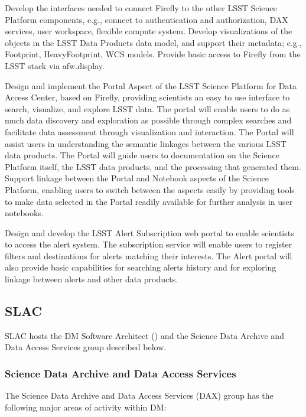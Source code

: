 Develop the interfaces needed to connect Firefly to the other LSST Science Platform components, e.g., connect to authentication and authorization, DAX services, user workspace, flexible compute system.  Develop visualizations of the objects in the LSST Data Products data model, and support their metadata; e.g., Footprint, HeavyFootprint, WCS models.  Provide basic access to Firefly from the LSST stack via afw.display.

Design and implement the Portal Aspect of the LSST Science Platform for Data Access Center, based on Firefly, providing scientists an easy to use interface to search, visualize, and explore LSST data. The portal will enable users to do as much data discovery and exploration as possible through complex searches and facilitate data assessment through visualization and interaction.  The Portal will assist users in understanding the semantic linkages between the various LSST data products. The Portal will guide users to documentation on the Science Platform itself, the LSST data products, and the processing that generated them.  Support linkage between the Portal and Notebook aspects of the Science Platform, enabling users to switch between the aspects easily by providing tools to make data selected in the Portal readily available for further analysis in user notebooks.

Design and develop the LSST Alert Subscription web portal to enable scientists to access the alert system. The subscription service will enable users to register filters and destinations for alerts matching their interests. The Alert portal will also provide basic capabilities for searching alerts history and for exploring linkage between alerts and other data products.




\subsection {SLAC\label{sect:slac}}
SLAC hosts the DM Software Architect () and the Science Data Archive and Data Access
Services group described below.

\subsubsection{Science Data Archive and Data Access Services \label{sect:dax}}

The Science Data Archive and Data Access Services (DAX) group has the following major areas of activity
within DM:

